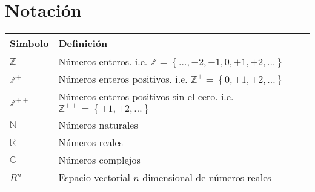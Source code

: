 \chapter*{Notación}

\begin{table}[ht!]
    \begin{center}
        \begin{tabularx}{\textwidth}{|l|X|}
            \hline
            \textbf{Simbolo}                                  & \textbf{Definición}                                                                                                         \\
            \hline
            $ \mathbb{Z} $                                    & Números enteros. \newline i.e. $ \scriptstyle{ \mathbb{Z}  = \left\{ \ldots, -2, -1, 0, +1, +2, \ldots \right\} } $         \\
            $ \mathbb{Z}^{+} $                                & Números enteros positivos. \newline i.e. $ \scriptstyle{ \mathbb{Z}^{+}  = \left\{ 0, +1, +2, \ldots \right\} } $           \\
            $ \mathbb{Z}^{++} $                               & Números enteros positivos sin el cero. \newline i.e. $ \scriptstyle{ \mathbb{Z}^{++}  = \left\{ +1, +2, \ldots \right\} } $ \\
            $ \mathbb{N} $                                    & Números naturales                                                                                                           \\
            $ \mathbb{R} $                                    & Números reales                                                                                                              \\
            $ \mathbb{C} $                                    & Números complejos                                                                                                           \\
            $ R^{n} $                                         & Espacio vectorial $n$-dimensional de números reales                                                                         \\


\end{tabularx}
\end{center}
\end{table}
